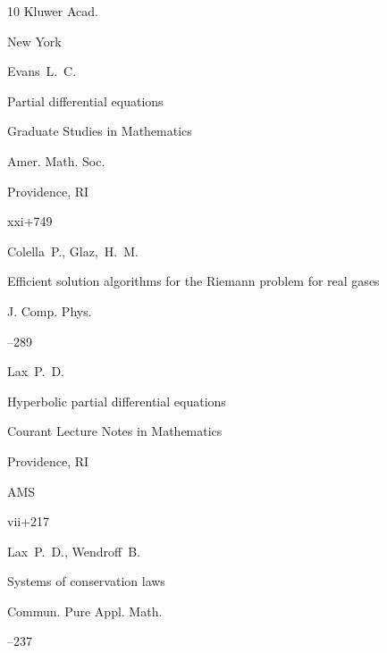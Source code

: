 \begin{thebibliography}{10}
\publ Kluwer Acad.

\publaddr New York 




\by Evans~L.~C.

\book Partial differential equations


\serial Graduate Studies in Mathematics


\publ Amer. Math. Soc.

\publaddr Providence, RI

\totalpages xxi+749





\by Colella~P., Glaz,~H.~M.

\paper Efficient solution algorithms for the Riemann problem for real gases

\jour J. Comp. Phys.



--289








\by Lax~P.~D.

\book Hyperbolic partial differential equations


\serial Courant Lecture Notes in Mathematics 


\publaddr Providence, RI

\publ AMS

\totalpages vii+217 





\by Lax~P.~D., Wendroff~B.

\paper Systems of conservation laws

\jour Commun. Pure Appl. Math. 



--237


\end{thebibliography}
